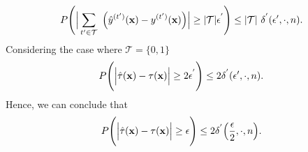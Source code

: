 \begin{equation*}
    P\Bigg( \Big| \sum_{t'\in\mathcal{T}}~\Big(\hat{y}^{(t')}(\mathbf{x}) - y^{(t')}(\mathbf{x})\Big)\Big|  \geq |\mathcal{T}|\epsilon^{'}\Bigg) \leq |\mathcal{T}|~\delta^{'}(\epsilon',\cdot,n).
\end{equation*}
Considering the case where $\mathcal{T}=\{0,1\}$
\begin{equation*}
    P\Bigg( \Big| \hat{\tau}(\mathbf{x}) - \tau(\mathbf{x})\Big|  \geq 2\epsilon^{'}\Bigg) \leq 2\delta^{'}(\epsilon',\cdot,n).
\end{equation*}
Hence, we can conclude that
\begin{equation*}
    P\Bigg( \Big| \hat{\tau}(\mathbf{x}) - \tau(\mathbf{x})\Big|  \geq \epsilon\Bigg) \leq 2\delta^{'}\Big(\frac{\epsilon}{2},\cdot,n\Big).
\end{equation*}



